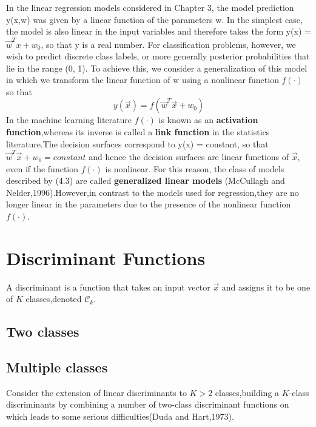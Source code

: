 In the linear regression models considered in Chapter 3, the model prediction
y(x,w) was given by a linear function of the parameters w. In the simplest case,
the model is also linear in the input variables and therefore takes the form y(x) =
$\vec{w}^Tx+w_0$, so that y is a real number. For classification problems, however, we wish
to predict discrete class labels, or more generally posterior probabilities that lie in
the range (0, 1). To achieve this, we consider a generalization of this model in which
we transform the linear function of w using a nonlinear function $f( · )$ so that
\begin{equation}
y(\vec{x}) = f(\vec{w}^T\vec{x} + w_0)
\end{equation}
In the machine learning literature $f(\cdot)$ is known as an \textbf{activation function},whereas its inverse is called a \textbf{link function} in the statistics literature.The decision surfaces correspond to y(x) = constant, so that $\vec{w}^T\vec{x} + w_0 = constant$ and hence the decision surfaces are linear functions of $\vec{x}$, even if the function $f(·)$ is nonlinear. For this reason, the class of models described by (4.3) are called \textbf{generalized linear models} (McCullagh and Nelder,1996).However,in contrast to the models used for regression,they are no longer linear in the parameters due to the presence of the nonlinear  function $f(\cdot)$.
\section{Discriminant Functions}
A discriminant is a function that takes an input vector $\vec{x}$ and assigns it to be one of $K$ classes,denoted  $\mathcal{C}_k$.
\subsection{Two classes}
\subsection{Multiple classes}
Consider the extension of linear discriminants to $ K >2$ classes,building a $K$-class discriminants by combining a number of two-class discriminant functions on which leads to some serious difficulties(Duda and Hart,1973).

